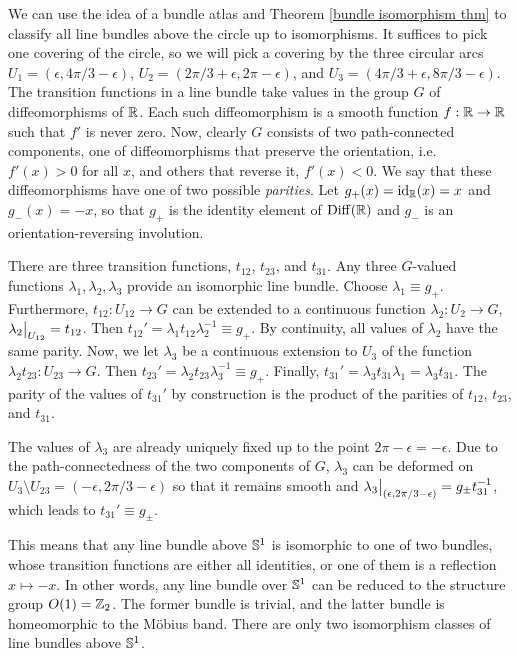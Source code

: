 \begin{example}\label{line bundles over S1}
    We can use the idea of a bundle atlas and Theorem \ref{bundle isomorphism thm} to classify all line bundles above the circle up to isomorphisms. It suffices to pick one covering of the circle, so we will pick a covering by the three circular arcs $U_1=(\epsilon,4\pi/3-\epsilon)$, $U_2=(2\pi/3+\epsilon,2\pi-\epsilon)$, and $U_3=(4\pi/3+\epsilon,8\pi/3-\epsilon)$. The transition functions in a line bundle take values in the group $G$ of diffeomorphisms of $\mathbb{R} $. Each such diffeomorphism is a smooth function $f:\mathbb{R} \to\mathbb{R} $ such that $f'$ is never zero. Now, clearly $G$ consists of two path-connected components, one of diffeomorphisms that preserve the orientation, i.e.\ $f'(x)>0$ for all $x$, and others that reverse it, $f'(x)<0$. We say that these diffeomorphisms have one of two possible \emph{parities}. Let $g_+(x)=\operatorname{id}_{\mathbb{R} }(x)=x$ and $g_-(x)=-x$, so that $g_+$ is the identity element of $\operatorname{Diff}(\mathbb{R} )$ and $g_-$ is an orientation-reversing involution.

    There are three transition functions, $t_{12}$, $t_{23}$, and $t_{31}$. Any three $G$-valued functions $\lambda_1,\lambda_2,\lambda_3$ provide an isomorphic line bundle. Choose $\lambda_1\equiv g_+$. Furthermore, $t_{12}:U_{12}\to G$ can be extended to a continuous function $\lambda_2: U_2\to G$, $\restr{\lambda_2}{U_{12}}=t_{12}$. Then $t_{12}'=\lambda_1 t_{12}\lambda_2^{-1}\equiv g_+$. By continuity, all values of $\lambda_2$ have the same parity.  Now, we let $\lambda_3$ be a continuous extension to $U_3$ of the function $\lambda_2 t_{23}:U_{23}\to G$. Then $t_{23}'=\lambda_2 t_{23} \lambda_3^{-1}\equiv g_+$. Finally, $t_{31}'=\lambda_3 t_{31} \lambda_1=\lambda_3 t_{31}$.  The parity of the values of $t_{31}'$ by construction is the product of the parities of $t_{12}$, $t_{23}$, and $t_{31}$.

    The values of $\lambda_3$ are already uniquely fixed up to the point $2\pi-\epsilon=-\epsilon$. Due to the path-connectedness of the two components of $G$, $\lambda_3$ can be deformed on $U_3\setminus U_{23}=(-\epsilon,2\pi/3-\epsilon)$ so that it remains smooth and $\restr{\lambda_3}{(\epsilon,2\pi/3-\epsilon)}=g_\pm t_{31}^{-1}$, which leads to $t_{31}'\equiv g_\pm$.

    This means that any line bundle above $\mathbb{S}^1$ is isomorphic to one of two bundles, whose transition functions are either all identities, or one of them is a reflection $x\mapsto -x$.  In other words, any line bundle over $\mathbb{S}^1$ can be reduced to the structure group $O(1)=\mathbb{Z}_2$. The former bundle is trivial, and the latter bundle is homeomorphic to the M\"obius band. There are only two isomorphism classes of line bundles above $\mathbb{S}^1$.
\end{example}

